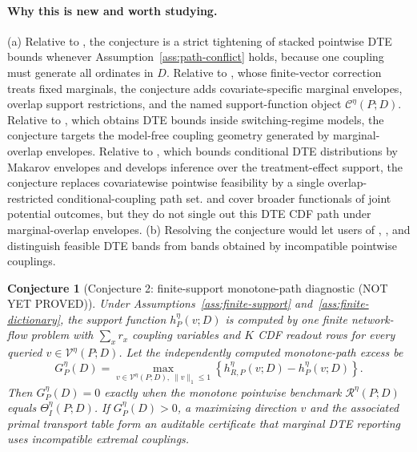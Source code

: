 \documentclass[11pt]{article}
\theoremstyle{definition}
\theoremstyle{plain}
\newtheorem{conjecture}{Conjecture}
\theoremstyle{remark}
\begin{document}
\paragraph{Why this is new and worth studying.}
(a) Relative to \citet[Section 2 and Lemma 2.3]{FanPark2010}, the conjecture is a strict
tightening of stacked pointwise DTE bounds whenever Assumption~\ref{ass:path-conflict}
holds, because one coupling must generate all ordinates in \(D\).  Relative to
\citet[Section 2]{FirpoRidder2019}, whose finite-vector correction treats fixed
marginals, the conjecture adds covariate-specific marginal envelopes, overlap support
restrictions, and the named support-function object \(\mathcal C^\eta(P;D)\).
Relative to \citet[Sections 2--3]{FanWu2010}, which obtains DTE bounds inside
switching-regime models, the conjecture targets the model-free coupling geometry
generated by marginal-overlap envelopes.  Relative
to \citet[Sections 2--3]{Lee2024}, which bounds conditional DTE distributions by Makarov envelopes and
develops inference over the treatment-effect support, the conjecture replaces
covariatewise pointwise feasibility by a single overlap-restricted conditional-coupling
path set.  \citet[Sections 2--3]{FanGuerreZhu2017} and \citet{Russell2021} cover broader functionals
of joint potential outcomes, but they do not single out this DTE CDF path under
marginal-overlap envelopes.  (b) Resolving the conjecture would let users of
\citet{FrandsenLefgren2021}, \citet{Lee2024}, and \citet{FanPark2010} distinguish
feasible DTE bands from bands obtained by incompatible pointwise couplings.

\begin{conjecture}[Conjecture 2: finite-support monotone-path diagnostic (NOT YET PROVED)]\label{conj:finite-diagnostic}
Under Assumptions~\ref{ass:finite-support} and~\ref{ass:finite-dictionary}, the support function
\(h^\eta_P(v;D)\) is computed by one finite network-flow problem with
\(\sum_x r_x\) coupling variables and \(K\) CDF readout rows for every queried
\(v\in\mathcal V^\eta(P;D)\).  Let the independently computed monotone-path excess be
\[
G^\eta_P(D)=
\max_{v\in\mathcal V^\eta(P;D),\ \|v\|_1\le1}
\left\{h^\eta_{R,P}(v;D)-h^\eta_P(v;D)\right\}.
\]
Then \(G^\eta_P(D)=0\) exactly when the monotone pointwise benchmark
\(\mathcal R^\eta(P;D)\) equals \(\Theta_I^\eta(P;D)\).  If \(G^\eta_P(D)>0\), a
maximizing direction \(v\) and the associated primal transport table form an auditable
certificate that marginal DTE reporting uses incompatible extremal couplings.
\end{conjecture}
\end{document}
